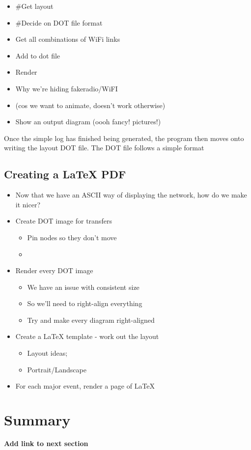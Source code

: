 \begin{itemize}
    \item \#Get layout
    \item \#Decide on DOT file format
    \item Get all combinations of WiFi links
    \item Add to dot file
    \item Render 
    \item Why we're hiding fakeradio/WiFI
    \item   (cos we want to animate, doesn't work otherwise)
    \item Show an output diagram (oooh fancy! pictures!)
\end{itemize}

Once the simple log has finished being generated, the program then moves onto writing the layout DOT file.
The DOT file follows a simple format

\subsection{Creating a LaTeX PDF}
\begin{itemize}
    \item Now that we have an ASCII way of displaying the network, how do we make it nicer?
    \item Create DOT image for transfers
    \begin{itemize}
        \item Pin nodes so they don't move
        \item 
    \end{itemize}
    \item Render every DOT image
    \begin{itemize}
        \item We have an issue with consistent size
        \item So we'll need to right-align everything
        \item Try and make every diagram right-aligned
    \end{itemize}
    \item Create a LaTeX template - work out the layout
    \begin{itemize}
        \item Layout ideas;
        \item Portrait/Landscape
    \end{itemize}
    \item For each major event, render a page of LaTeX
\end{itemize}

\section{Summary}
\textbf{Add link to next section}